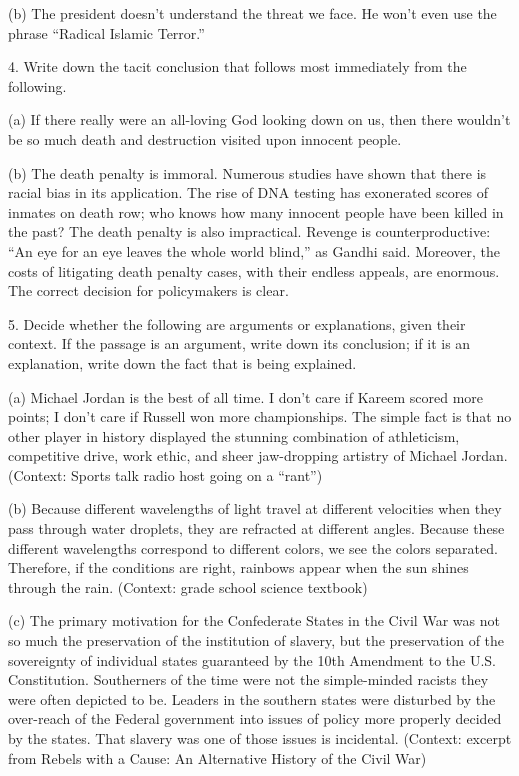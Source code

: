 (b) The president doesn't understand the threat we face. He won't even use the phrase
``Radical Islamic Terror.''

4. Write down the tacit conclusion that follows most immediately from the following.

(a) If there really were an all-loving God looking down on us, then there wouldn't be so
much death and destruction visited upon innocent people.

(b) The death penalty is immoral. Numerous studies have shown that there is racial bias in
its application. The rise of DNA testing has exonerated scores of inmates on death row;
who knows how many innocent people have been killed in the past? The death penalty is
also impractical. Revenge is counterproductive: ``An eye for an eye leaves the whole world
blind,'' as Gandhi said. Moreover, the costs of litigating death penalty cases, with their
endless appeals, are enormous. The correct decision for policymakers is clear.

5. Decide whether the following are arguments or explanations, given their context. If the passage
is an argument, write down its conclusion; if it is an explanation, write down the fact that is being
explained.

(a) Michael Jordan is the best of all time. I don't care if Kareem scored more points; I
don't care if Russell won more championships. The simple fact is that no other player in
history displayed the stunning combination of athleticism, competitive drive, work ethic,
and sheer jaw-dropping artistry of Michael Jordan. (Context: Sports talk radio host going
on a ``rant'')

(b) Because different wavelengths of light travel at different velocities when they pass
through water droplets, they are refracted at different angles. Because these different
wavelengths correspond to different colors, we see the colors separated. Therefore, if the
conditions are right, rainbows appear when the sun shines through the rain. (Context: grade
school science textbook)

(c) The primary motivation for the Confederate States in the Civil War was not so much
the preservation of the institution of slavery, but the preservation of the sovereignty of
individual states guaranteed by the 10th Amendment to the U.S. Constitution. Southerners
of the time were not the simple-minded racists they were often depicted to be. Leaders in
the southern states were disturbed by the over-reach of the Federal government into issues
of policy more properly decided by the states. That slavery was one of those issues is
incidental. (Context: excerpt from Rebels with a Cause: An Alternative History of the Civil
War)

